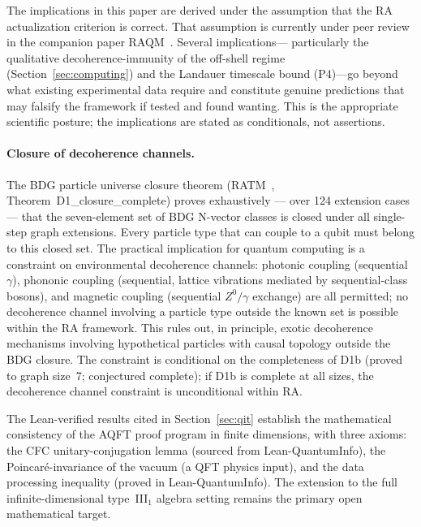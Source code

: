 \documentclass[11pt,a4paper]{article}
\theoremstyle{plain}
\theoremstyle{definition}
\theoremstyle{remark}
\begin{document}
The implications in this paper are derived under the assumption that the RA
actualization criterion is correct. That assumption is currently under peer review
in the companion paper RAQM~\citep{Sandeman2026a}. Several implications---
particularly the qualitative decoherence-immunity of the off-shell regime
(Section~\ref{sec:computing}) and the Landauer timescale bound (P4)---go beyond
what existing experimental data require and constitute genuine predictions that may
falsify the framework if tested and found wanting. This is the appropriate
scientific posture; the implications are stated as conditionals, not assertions.

\paragraph{Closure of decoherence channels.}
The BDG particle universe closure theorem
(RATM~\citep{Sandeman2026RATM}, Theorem~D1\_closure\_complete) proves
exhaustively --- over 124 extension cases --- that the seven-element set of
BDG N-vector classes is closed under all single-step graph extensions. Every
particle type that can couple to a qubit must belong to this closed set.
The practical implication for quantum computing is a constraint on environmental
decoherence channels: photonic coupling (sequential $\gamma$), phononic
coupling (sequential, lattice vibrations mediated by sequential-class bosons),
and magnetic coupling (sequential $Z^0/\gamma$ exchange) are all permitted;
no decoherence channel involving a particle type outside the known set is
possible within the RA framework. This rules out, in principle, exotic
decoherence mechanisms involving hypothetical particles with causal topology
outside the BDG closure. The constraint is conditional on the completeness of
D1b (proved to graph size~7; conjectured complete); if D1b is complete at all
sizes, the decoherence channel constraint is unconditional within RA.



The Lean-verified results cited in Section~\ref{sec:qit} establish the
mathematical consistency of the AQFT proof program in finite dimensions, with three
axioms: the CFC unitary-conjugation lemma (sourced from Lean-QuantumInfo), the
Poincar\'{e}-invariance of the vacuum (a QFT physics input), and the data
processing inequality (proved in Lean-QuantumInfo). The extension to the full
infinite-dimensional type~III$_1$ algebra setting remains the primary open
mathematical target.

\end{document}
